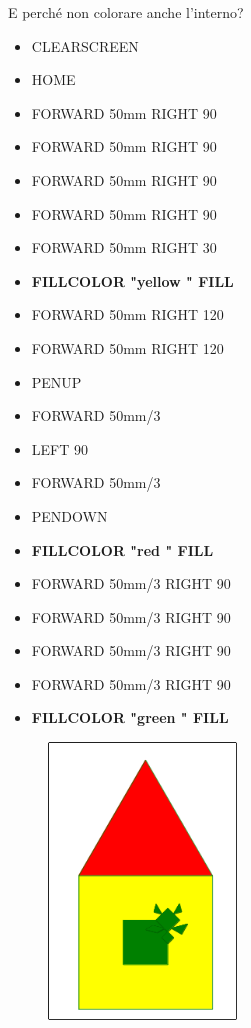 \vskip 1cm

E perché non colorare anche l'interno?

\vskip 1cm

\begin{scriptsize}
\begin{minipage}{0.40\textwidth}
\begin{itemize}[itemsep=-3pt,parsep=2pt]
\item[] CLEARSCREEN            
\item[] HOME
\item[] FORWARD 50mm RIGHT 90
\item[] FORWARD 50mm RIGHT 90
\item[] FORWARD 50mm RIGHT 90
\item[] FORWARD 50mm RIGHT 90
\item[] FORWARD 50mm RIGHT 30
\item[] \textbf{FILLCOLOR  "yellow " FILL}
\item[] FORWARD 50mm RIGHT 120
\item[] FORWARD 50mm RIGHT 120
\item[] PENUP
\item[] FORWARD 50mm/3
\item[] LEFT 90
\item[] FORWARD 50mm/3
\item[] PENDOWN
\item[] \textbf{FILLCOLOR  "red " FILL}
\item[] FORWARD 50mm/3 RIGHT 90
\item[] FORWARD 50mm/3 RIGHT 90
\item[] FORWARD 50mm/3 RIGHT 90
\item[] FORWARD 50mm/3 RIGHT 90
\item[] \textbf{FILLCOLOR  "green " FILL}
\end{itemize}
\end{minipage}
\end{scriptsize}
\begin{minipage}{0.4\textwidth}
\begin{figure}[H]
   \includegraphics[width=5.0cm,trim=4 4 8 4,clip]{./images/disegnare/disegnare-11.png}
   \label{dis-11}
\end{figure}
\end{minipage} \hfill

